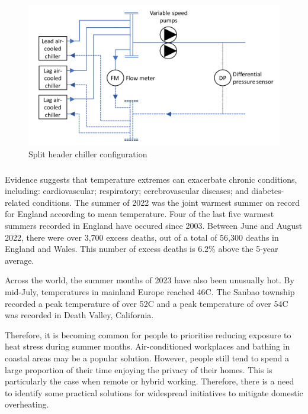 \documentclass[11pt, oneside]{book}   	%
\begin{document}
\pagebreak

\FloatBarrier
\begin{figure}
\begin{center}
\includegraphics[width=1\textwidth]{splitHeader.PNG}
\caption{Split header chiller configuration}
\label{Split Header figure}
\end{center}
\end{figure}
\FloatBarrier

\pagebreak

\subsubsection{\color{YellowOrange}{P2: Summertime Domestic Overheating}}
Evidence suggests that temperature extremes can exacerbate chronic conditions, including: cardiovascular; respiratory; cerebrovascular diseases; and diabetes-related conditions.
The summer of 2022 was the joint warmest summer on record for England according to mean temperature.
Four of the last five warmest summers recorded in England have occured since 2003.
Between June and August 2022, there were over 3,700 excess deaths, out of a total of 56,300 deaths in England and Wales.
This number of excess deaths is 6.2\% above the 5-year average.\

Across the world, the summer months of 2023 have also been unusually hot.
By mid-July, temperatures in mainland Europe reached 46\textdegree C.
The Sanbao township recorded a peak temperature of over 52\textdegree C and a peak temperature of over 54\textdegree C was recorded in Death Valley, California.\

Therefore, it is becoming common for people to prioritise reducing exposure to heat stress during summer months.
Air-conditioned workplaces and bathing in coastal areas may be a popular solution.
However, people still tend to spend a large proportion of their time enjoying the privacy of their homes.
This is particularly the case when remote or hybrid working.
Therefore, there is a need to identify some practical solutions for widespread initiatives to mitigate domestic overheating.\
\end{document}
